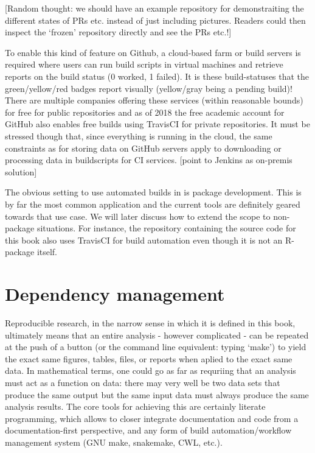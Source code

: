 \documentclass[]{book}
\begin{document}
{[}Random thought: we should have an example repository for
demonstraiting the different states of PRs etc. instead of just
including pictures. Readers could then inspect the `frozen' repository
directly and see the PRs etc.!{]}

To enable this kind of feature on Github, a cloud-based farm or build
servers is required where users can run build scripts in virtual
machines and retrieve reports on the build status (0 worked, 1 failed).
It is these build-statuses that the green/yellow/red badges report
visually (yellow/gray being a pending build)! There are multiple
companies offering these services (within reasonable bounds) for free
for public repositories and as of 2018 the free academic account for
GitHub also enables free builds using TravisCI for private repositories.
It must be stressed though that, since everything is running in the
cloud, the same constraints as for storing data on GitHub servers apply
to downloading or processing data in buildscripts for CI services.
{[}point to Jenkins as on-premis solution{]}

The obvious setting to use automated builds in is package development.
This is by far the most common application and the current tools are
definitely geared towards that use case. We will later discuss how to
extend the scope to non-package situations. For instance, the repository
containing the source code for this book also uses TravisCI for build
automation even though it is not an R-package itself.

\chapter{Dependency management}\label{dependency-management}

Reproducible research, in the narrow sense in which it is defined in
this book, ultimately means that an entire analysis - however
complicated - can be repeated at the push of a button (or the command
line equivalent: typing `make') to yield the exact same figures, tables,
files, or reports when aplied to the exact same data. In mathematical
terms, one could go as far as requriing that an analysis must act as a
function on data: there may very well be two data sets that produce the
same output but the same input data must always produce the same
analysis results. The core tools for achieving this are certainly
literate programming, which allows to closer integrate documentation and
code from a documentation-first perspective, and any form of build
automation/workflow management system (GNU make, snakemake, CWL, etc.).
\end{document}
